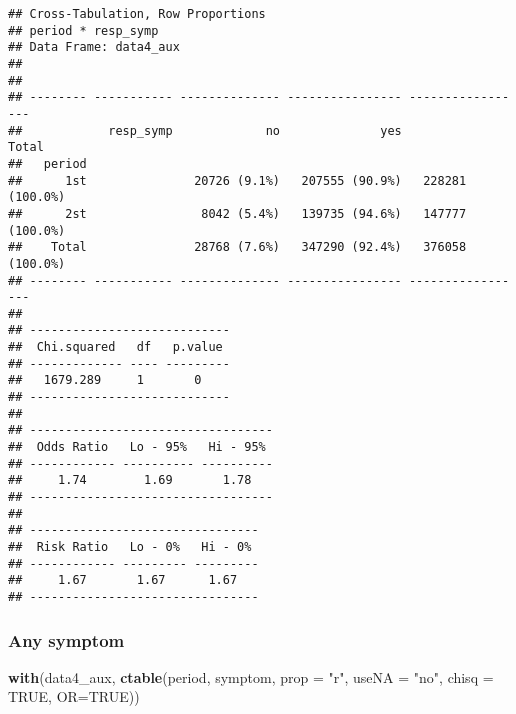 \documentclass[
]{article}
\newenvironment{Shaded}{\begin{snugshade}}{\end{snugshade}}
\newcommand{\DataTypeTok}[1]{\textcolor[rgb]{0.13,0.29,0.53}{#1}}
\newcommand{\KeywordTok}[1]{\textcolor[rgb]{0.13,0.29,0.53}{\textbf{#1}}}
\newcommand{\NormalTok}[1]{#1}
\newcommand{\OtherTok}[1]{\textcolor[rgb]{0.56,0.35,0.01}{#1}}
\newcommand{\StringTok}[1]{\textcolor[rgb]{0.31,0.60,0.02}{#1}}
\begin{document}
\begin{verbatim}
## Cross-Tabulation, Row Proportions  
## period * resp_symp  
## Data Frame: data4_aux  
## 
## 
## -------- ----------- -------------- ---------------- -----------------
##            resp_symp             no              yes             Total
##   period                                                              
##      1st               20726 (9.1%)   207555 (90.9%)   228281 (100.0%)
##      2st                8042 (5.4%)   139735 (94.6%)   147777 (100.0%)
##    Total               28768 (7.6%)   347290 (92.4%)   376058 (100.0%)
## -------- ----------- -------------- ---------------- -----------------
## 
## ----------------------------
##  Chi.squared   df   p.value 
## ------------- ---- ---------
##   1679.289     1       0    
## ----------------------------
## 
## ----------------------------------
##  Odds Ratio   Lo - 95%   Hi - 95% 
## ------------ ---------- ----------
##     1.74        1.69       1.78   
## ----------------------------------
## 
## --------------------------------
##  Risk Ratio   Lo - 0%   Hi - 0% 
## ------------ --------- ---------
##     1.67       1.67      1.67   
## --------------------------------
\end{verbatim}

\hypertarget{any-symptom}{%
\subsubsection{Any symptom}\label{any-symptom}}

\begin{Shaded}
\begin{Highlighting}[]
\KeywordTok{with}\NormalTok{(data4_aux, }\KeywordTok{ctable}\NormalTok{(period, symptom, }\DataTypeTok{prop =} \StringTok{"r"}\NormalTok{, }\DataTypeTok{useNA =} \StringTok{"no"}\NormalTok{, }\DataTypeTok{chisq =} \OtherTok{TRUE}\NormalTok{, }\DataTypeTok{OR=}\OtherTok{TRUE}\NormalTok{))}
\end{Highlighting}
\end{Shaded}
\end{document}
